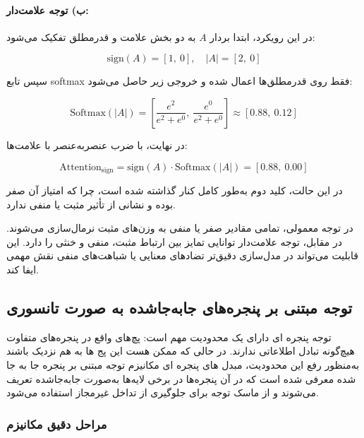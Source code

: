 \paragraph{ب) توجه علامت‌دار:}

در این رویکرد، ابتدا بردار $A$ به دو بخش علامت و قدرمطلق تفکیک می‌شود:

\[
\text{sign}(A) = [1,\ 0], \quad
|A| = [2,\ 0]
\]

سپس تابع softmax فقط روی قدرمطلق‌ها اعمال شده و خروجی زیر حاصل می‌شود:

\[
\text{Softmax}(|A|) = 
\left[
\frac{e^2}{e^2 + e^0},\ 
\frac{e^0}{e^2 + e^0}
\right]
\approx [0.88,\ 0.12]
\]

در نهایت، با ضرب عنصر‌به‌عنصر با علامت‌ها:

\[
\text{Attention}_{\text{sign}} = 
\text{sign}(A) \cdot \text{Softmax}(|A|) = [0.88,\ 0.00]
\]

در این حالت، کلید دوم به‌طور کامل کنار گذاشته شده است، چرا که امتیاز آن صفر بوده و نشانی از تأثیر مثبت یا منفی ندارد.


در توجه معمولی، تمامی مقادیر صفر یا منفی به وزن‌های مثبت نرمال‌سازی می‌شوند. در مقابل، توجه علامت‌دار توانایی تمایز بین ارتباط مثبت، منفی و خنثی را دارد. این قابلیت می‌تواند در مدل‌سازی دقیق‌تر تضادهای معنایی یا شباهت‌های منفی نقش مهمی ایفا کند.


\subsection{توجه مبتنی بر پنجره‌های جابه‌جا‌شده به صورت تانسوری}



توجه پنجره ای دارای یک محدودیت مهم است: پچ‌های واقع در پنجره‌های متفاوت هیچ‌گونه تبادل اطلاعاتی ندارند.
در حالی که ممکن هست این پج ها به هم نزدیک باشند به‌منظور رفع این محدودیت، مبدل های پنجره ای مکانیزم توجه مبتنی بر پنجره جا به جا شده معرفی شده است که در آن پنجره‌ها در برخی لایه‌ها به‌صورت جابه‌جا‌شده تعریف می‌شوند و از ماسک توجه برای جلوگیری از تداخل غیرمجاز استفاده می‌شود.

\subsubsection*{مراحل دقیق مکانیزم }

